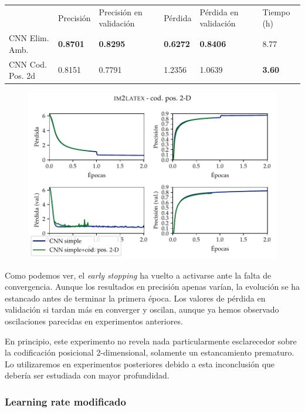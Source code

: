 \documentclass[a4paper, 20pt, dvipsnames]{article}
\begin{document}
\begin{table}[H]
	\centering
	\begin{tabular}{llllll}
		& Precisión       & Precisión en validación & Pérdida         & Pérdida en validación & Tiempo (h)    \\ \cline{2-6} 
		CNN Elim. Amb.   & \textbf{0.8701} & \textbf{0.8295}         & \textbf{0.6272} & \textbf{0.8406}       & 8.77          \\
		CNN Cod. Pos. 2d & 0.8151          & 0.7791                  & 1.2356          & 1.0639                & \textbf{3.60}
	\end{tabular}
\end{table}

\begin{figure}[H]
	\centering
	\includegraphics{fig/im2latex-3c.pdf}
\end{figure}

Como podemos ver, el \emph{early stopping} ha vuelto a activarse ante la falta de
convergencia. Aunque los resultados en precisión apenas varían, la evolución se ha
estancado antes de terminar la primera época. Los valores de pérdida en validación
si tardan más en converger y oscilan, aunque ya hemos observado oscilaciones
parecidas en experimentos anteriores.

En principio, este experimento no revela nada particularmente esclarecedor sobre la
codificación posicional 2-dimensional, solamente un estancamiento prematuro. Lo
utilizaremos en experimentos posteriores debido a esta inconclusión que debería
ser estudiada con mayor profundidad. 


\subsubsection{Learning rate modificado}
\end{document}
